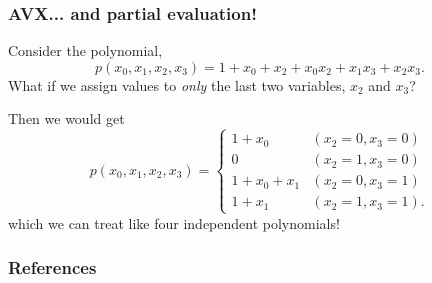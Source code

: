 \documentclass{beamer}
\begin{document}
    \begin{frame}
        \frametitle{AVX... and partial evaluation!}
        Consider the polynomial,
        $$
            p(x_0, x_1, x_2, x_3) = 1 + x_0 + x_2 + x_0x_2 + x_1x_3 + x_2x_3.
        $$
        What if we assign values to \textit{only} the last two variables, $x_2$ and $x_3$? 

        \pause 

        Then we would get
        \begin{equation*}
            p(x_0,x_1,x_2,x_3) = 
            \begin{cases}
                1 + x_0       & (x_2 = 0, x_3 = 0)\\
                0             & (x_2 = 1, x_3 = 0)\\
                1 + x_0 + x_1 & (x_2 = 0, x_3 = 1)\\
                1 + x_1       & (x_2 = 1, x_3 = 1).
            \end{cases}
        \end{equation*} 
        which we can treat like four independent polynomials!
        
    \end{frame}

\begin{frame}
    \frametitle{References}
    \printbibliography
\end{frame}
\end{document}
